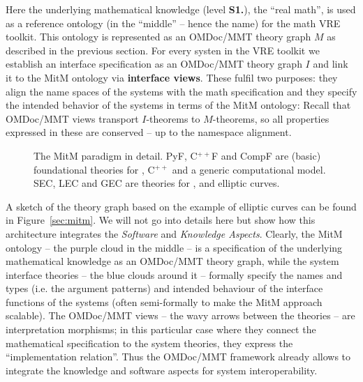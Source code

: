 Here the underlying mathematical knowledge (level \textbf{S1.}), the ``real math'', is
used as a reference ontology (in the ``middle'' -- hence the name) for the math VRE
toolkit. This ontology is represented as an OMDoc/MMT theory graph $M$ as described in the
previous section. For every systen in the \pn VRE toolkit we establish an interface
specification as an OMDoc/MMT theory graph $I$ and link it to the MitM ontology via
\textbf{interface views}. These fulfil two purposes: they align the name spaces of the
systems with the math specification and they specify the intended behavior of the systems
in terms of the MitM ontology: Recall that OMDoc/MMT views transport $I$-theorems to
$M$-theorems, so all properties expressed in these are conserved -- up to the namespace
alignment.

\begin{figure}[ht]\centering
  \def\myxscale{3}\def\myyscale{1.2}
  
  \caption{The MitM paradigm in detail. PyF, C${}^{++}$F and CompF are (basic)
    foundational theories for \python, C${}^{++}$ and a generic computational model. SEC,
    LEC and GEC are theories for \SageMath, \LMFDB and \GAP elliptic curves.}\label{fig:mitm}
\end{figure}

A sketch of the theory graph based on the example of elliptic curves can be found in
Figure~\ref{sec:mitm}. We will not go into details here but show how this architecture
integrates the \emph{Software} and \emph{Knowledge Aspects}. Clearly, the MitM ontology --
the purple cloud in the middle -- is a specification of the underlying mathematical
knowledge as an OMDoc/MMT theory graph, while the system interface theories -- the blue
clouds around it -- formally specify the names and types (i.e. the argument patterns) and
intended behaviour of the interface functions of the systems (often semi-formally to make
the MitM approach scalable). The OMDoc/MMT views -- the wavy arrows between the theories
-- are interpretation morphisms; in this particular case where they connect the
mathematical specification to the system theories, they express the ``implementation
relation''. Thus the OMDoc/MMT framework already allows to integrate the knowledge and
software aspects for system interoperability.

